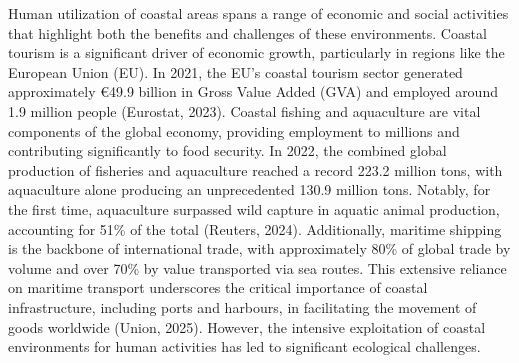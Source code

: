 \documentclass[
  letterpaper,
  11pt,
  english,
  singlespacing,
  headsepline]{MastersDoctoralThesis}
\begin{document}
\begin{spacing}{1.5}
Human utilization of coastal areas spans a range of economic and social
activities that highlight both the benefits and challenges of these
environments. Coastal tourism is a significant driver of economic
growth, particularly in regions like the European Union (EU). In 2021,
the EU's coastal tourism sector generated approximately €49.9 billion in
Gross Value Added (GVA) and employed around 1.9 million people
(Eurostat, 2023). Coastal fishing and aquaculture are vital components
of the global economy, providing employment to millions and contributing
significantly to food security. In 2022, the combined global production
of fisheries and aquaculture reached a record 223.2 million tons, with
aquaculture alone producing an unprecedented 130.9 million tons.
Notably, for the first time, aquaculture surpassed wild capture in
aquatic animal production, accounting for 51\% of the total (Reuters,
2024). Additionally, maritime shipping is the backbone of international
trade, with approximately 80\% of global trade by volume and over 70\%
by value transported via sea routes. This extensive reliance on maritime
transport underscores the critical importance of coastal infrastructure,
including ports and harbours, in facilitating the movement of goods
worldwide (Union, 2025). However, the intensive exploitation of coastal
environments for human activities has led to significant ecological
challenges.


\end{spacing}
\end{document}

